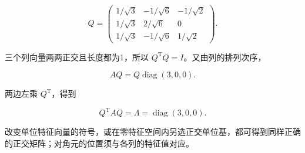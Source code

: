 \documentclass[UTF8,11pt,fontset=windows]{ctexart}
\begin{document}
$$
\boxed{Q=\begin{pmatrix}
1/\sqrt3&-1/\sqrt6&-1/\sqrt2\\
1/\sqrt3&2/\sqrt6&0\\
1/\sqrt3&-1/\sqrt6&1/\sqrt2
\end{pmatrix}.}
$$

三个列向量两两正交且长度都为1，所以 $Q^{\mathrm T}Q=I$。又由列的排列次序，

$$
AQ=Q\operatorname{diag}(3,0,0).
$$

两边左乘 $Q^{\mathrm T}$，得到

$$
\boxed{Q^{\mathrm T}AQ=\Lambda=\operatorname{diag}(3,0,0).}
$$

改变单位特征向量的符号，或在零特征空间内另选正交单位基，都可得到同样正确的正交矩阵；对角元的位置须与各列的特征值对应。
\end{document}
